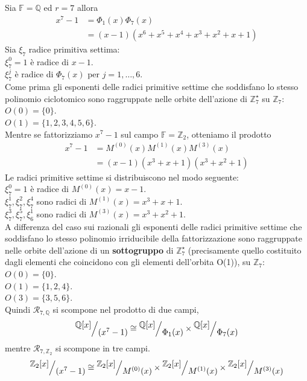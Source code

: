 \begin{esempio} \label{ese:fattorQ_7}
Sia $\mathbb{F} = \mathbb{Q}$ ed $r = 7$ allora
\begin{align*}
  x^{7} - 1 &= \Phi_{1}(x) \Phi_{7}(x) \\
            &= (x-1)(x^6 +x^5 + x^4 + x^3 +x^2 + x +1)
\end{align*}
Sia $\xi_{7}$ radice primitiva settima:\\
$\xi_{7}^{0} = 1$ è radice di $x-1$.\\
$\xi_{7}^{j}$ è radice di $\Phi_{7}(x)$ per $j = 1, \dots ,6 $.\\
Come prima gli esponenti delle radici primitive settime che soddisfano lo
stesso polinomio ciclotomico sono raggruppate nelle orbite dell'azione di
$\mathbb{Z}_{7}^{\star}$ su $\mathbb{Z}_{7}$: \\
$O(0)= \lbrace 0 \rbrace$.\\
$O(1)= \lbrace 1,2,3,4,5,6 \rbrace$.\\
Mentre se fattorizziamo $ x^{7} - 1$ sul campo $\mathbb{F} = \mathbb{Z}_{2}$,
otteniamo il prodotto
\begin{align*}
  x^{7} - 1 &= M^{(0)}(x) M^{(1)}(x) M^{(3)}(x) \\
            &= (x-1)(x^3 + x + 1)(x^3 + x^2 + 1) 
\end{align*}
Le radici primitive settime si distribuiscono nel modo seguente: \\
$\xi_{7}^{0} = 1$ è radice di $M^{(0)}(x) = x-1$.\\
$\xi_{7}^{1}, \xi_{7}^{2}, \xi_{7}^{4}$ sono radici di $M^{(1)}(x) = x^3 + x +
1$.\\
$\xi_{7}^{3}, \xi_{7}^{5}, \xi_{6}^{1}$ sono radici di $M^{(3)}(x)= x^3 + x^2 +
1$.\\
A differenza del caso sui razionali gli esponenti delle radici primitive settime
che soddisfano lo
stesso polinomio irriducibile della fattorizzazione sono raggruppate nelle
orbite dell'azione di un {\bf sottogruppo} di
$\mathbb{Z}_{7}^{\star}$ (precisamente quello costituito dagli elementi che
coincidono con gli elementi dell'orbita O(1)), su $\mathbb{Z}_{7}$: \\
$O(0)= \lbrace 0 \rbrace$.\\
$O(1)= \lbrace 1,2,4 \rbrace$.\\
$O(3)= \lbrace 3,5,6 \rbrace$.\\
Quindi $ \mathcal{R}_{7, \mathbb{Q}} $ si scompone nel prodotto di due
campi, 
\begin{align*}
\quotient{\mathbb{Q} \lbrack x \rbrack  }{(x^{7} - 1)}
\cong
\quotient{\mathbb{Q} \lbrack x \rbrack  }{\Phi_{1}(x)}
\times
\quotient{\mathbb{Q} \lbrack x \rbrack  }{\Phi_{7}(x)}
\end{align*}
mentre $\mathcal{R}_{7, \mathbb{Z}_{2}}$ si scompone in tre campi.
\begin{align*}
\quotient{\mathbb{Z}_{2} \lbrack x \rbrack  }{(x^{7} - 1)}
\cong
\quotient{\mathbb{Z}_{2} \lbrack x \rbrack  }{M^{(0)}(x)}
\times
\quotient{\mathbb{Z}_{2} \lbrack x \rbrack  }{M^{(1)}(x)}
\times
\quotient{\mathbb{Z}_{2} \lbrack x \rbrack  }{M^{(3)}(x)}
\end{align*}
\end{esempio}

